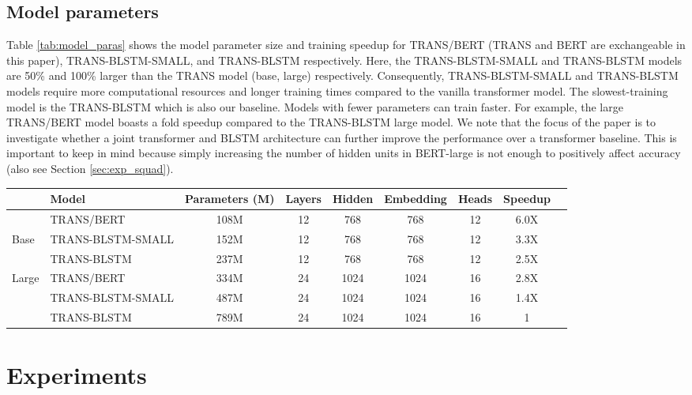 \documentclass[11pt,a4paper]{article}
\begin{document}
\subsection{Model parameters}
Table \ref{tab:model_paras} shows the model parameter size and training speedup for TRANS/BERT (TRANS and BERT are exchangeable in this paper), TRANS-BLSTM-SMALL, and TRANS-BLSTM respectively. 
Here, the TRANS-BLSTM-SMALL and TRANS-BLSTM models are 50\% and 100\% larger than the TRANS model (base, large) respectively. Consequently, TRANS-BLSTM-SMALL and TRANS-BLSTM models require more computational resources and longer training times compared to the vanilla transformer model. The slowest-training model is the TRANS-BLSTM which is also our baseline. Models with fewer parameters can train faster. For example, the large TRANS/BERT model boasts a  fold speedup compared to the TRANS-BLSTM large model. We note that the focus of the paper is to investigate whether a joint transformer and BLSTM architecture can further improve the performance over a transformer baseline. This is important to keep in mind because simply increasing the number of hidden units in BERT-large is not enough to positively affect accuracy \cite{lan2019} (also see Section \ref{sec:exp_squad}). 

\begin{table*}[!hbpt]
\small
\centering
    \begin{tabular}{llccccccc}
  & Model & Parameters (M) & Layers & Hidden & Embedding & Heads & Speedup\\ \hline
   & TRANS/BERT & 108M & 12 & 768 & 768 & 12 & 6.0X\\
   Base & TRANS-BLSTM-SMALL & 152M & 12 & 768 & 768 & 12 & 3.3X \\
  & TRANS-BLSTM  & 237M & 12 & 768 & 768 & 12 & 2.5X \\ 
    \hline
    Large & TRANS/BERT & 334M & 24 & 1024 & 1024 & 16 & 2.8X\\
   & TRANS-BLSTM-SMALL & 487M &  24 & 1024 & 1024 & 16  & 1.4X\\ 
   & TRANS-BLSTM & 789M &  24 & 1024 & 1024  & 16 & 1\\ \hline
\end{tabular}
    \caption{Parameter size and training speed for TRANS/BERT, TRANS-BLSTM-SMALL, and TRANS-BLSTM on base and large settings respectively.}
\label{tab:model_paras}
\end{table*} 

\section{Experiments}
\end{document}
